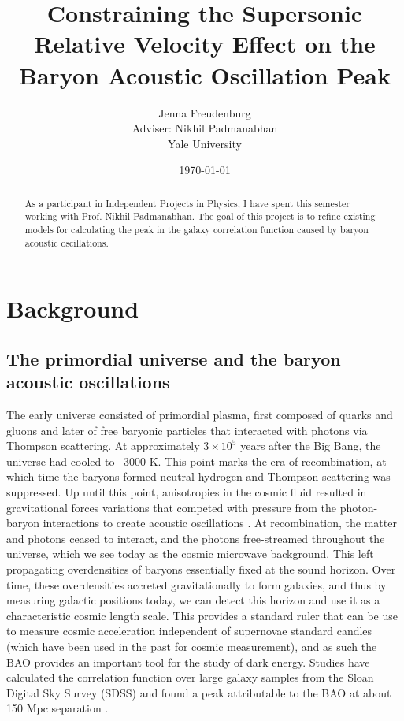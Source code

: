 \documentclass[12pt]{article}
\title{Constraining the Supersonic Relative Velocity Effect on the Baryon Acoustic Oscillation Peak}
\author{Jenna Freudenburg \\
                Adviser: Nikhil Padmanabhan\\
                Yale University
}
\date{\today}
\begin{document}
\maketitle

\begin{abstract} 
As a participant in Independent Projects in Physics, I have spent this semester working with Prof. Nikhil Padmanabhan. The goal of this project is to refine existing models for calculating the peak in the galaxy correlation function caused by baryon acoustic oscillations.
\end{abstract}
\tableofcontents

\section{Background}
\subsection{The primordial universe and the baryon acoustic oscillations}

The early universe consisted of primordial plasma, first composed of quarks and gluons and later of free baryonic particles that interacted with photons via Thompson scattering. At approximately $3\times10^{5}$ years after the Big Bang, the universe had cooled to ~3000 K. This point marks the era of recombination, at which time the baryons formed neutral hydrogen and Thompson scattering was suppressed. Up until this point, anisotropies in the cosmic fluid resulted in gravitational forces variations that competed with pressure from the photon-baryon interactions to create acoustic oscillations \cite{Eisenstein}. At recombination, the matter and photons ceased to interact, and the photons free-streamed throughout the universe, which we see today as the cosmic microwave background. This left propagating overdensities of baryons essentially fixed at the sound horizon. Over time, these overdensities accreted gravitationally to form galaxies, and thus by measuring galactic positions today, we can detect this horizon and use it as a characteristic cosmic length scale. This provides a standard ruler that can be use to measure cosmic acceleration independent of supernovae standard candles (which have been used in the past for cosmic measurement), and as such the BAO provides an important tool for the study of dark energy. Studies have calculated the correlation function over large galaxy samples from the Sloan Digital Sky Survey (SDSS) and found a peak attributable to the BAO at about 150 Mpc separation \cite{Eisensteinetal}.
\end{document}
